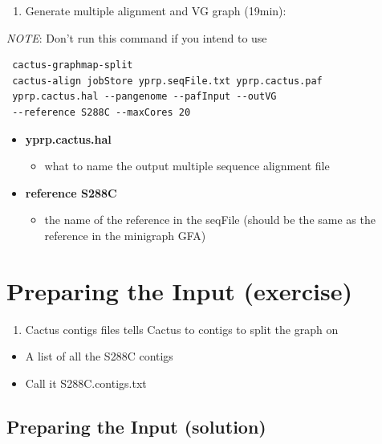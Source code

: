 \documentclass[
]{book}
\providecommand{\tightlist}{%
  \setlength{\itemsep}{0pt}\setlength{\parskip}{0pt}}
\begin{document}
\begin{enumerate}
\def\labelenumi{\arabic{enumi}.}
\setcounter{enumi}{1}
\tightlist
\item
  Generate multiple alignment and VG graph (19min):
\end{enumerate}

\emph{NOTE}: Don't run this command if you intend to use

\begin{verbatim}
 cactus-graphmap-split
 cactus-align jobStore yprp.seqFile.txt yprp.cactus.paf
 yprp.cactus.hal --pangenome --pafInput --outVG
 --reference S288C --maxCores 20
\end{verbatim}

\begin{itemize}
\tightlist
\item
  \textbf{yprp.cactus.hal}

  \begin{itemize}
  \tightlist
  \item
    what to name the output multiple sequence alignment file
  \end{itemize}
\item
  \textbf{reference S288C}

  \begin{itemize}
  \tightlist
  \item
    the name of the reference in the seqFile (should be the same as
    the reference in the minigraph GFA)
  \end{itemize}
\end{itemize}

\hypertarget{preparing-the-input-exercise-1}{%
\section{Preparing the Input (exercise)}\label{preparing-the-input-exercise-1}}

\begin{enumerate}
\def\labelenumi{\arabic{enumi}.}
\tightlist
\item
  Cactus contigs files tells Cactus to contigs to split the graph on
\end{enumerate}

\begin{itemize}
\tightlist
\item
  A list of all the S288C contigs
\item
  Call it S288C.contigs.txt
\end{itemize}

\hypertarget{preparing-the-input-solution}{%
\subsection{Preparing the Input (solution)}\label{preparing-the-input-solution}}
\end{document}
